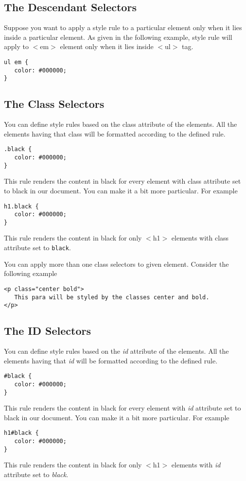 \documentclass[a4paper,oneside]{book}
\numberwithin{equation}{chapter}
\begin{document}
\subsection{The Descendant Selectors}
Suppose you want to apply a style rule to a particular element only when it lies inside a particular element. As given in the following example, style rule will apply to $<$em$>$ element only when it lies inside $<$ul$>$ tag.
\begin{verbatim}
ul em {
   color: #000000; 
}
\end{verbatim}
\subsection{The Class Selectors}
You can define style rules based on the class attribute of the elements. All the elements having that class will be formatted according to the defined rule.
\begin{verbatim}
.black {
   color: #000000; 
}
\end{verbatim}
This rule renders the content in black for every element with class attribute set to black in our document. You can make it a bit more particular. For example
\begin{verbatim}
h1.black {
   color: #000000; 
}
\end{verbatim}
This rule renders the content in black for only $<$h1$>$ elements with class attribute set to \texttt{black}.

You can apply more than one class selectors to given element. Consider the following example
\begin{verbatim}
<p class="center bold">
   This para will be styled by the classes center and bold.
</p>
\end{verbatim}
\subsection{The ID Selectors}
You can define style rules based on the \textit{id} attribute of the elements. All the elements having that \textit{id} will be formatted according to the defined rule.
\begin{verbatim}
#black {
   color: #000000; 
}
\end{verbatim}
This rule renders the content in black for every element with \textit{id} attribute set to black in our document. You can make it a bit more particular. For example
\begin{verbatim}
h1#black {
   color: #000000; 
}
\end{verbatim}
This rule renders the content in black for only $<$h1$>$ elements with \textit{id} attribute set to \textit{black}. 
\end{document}
